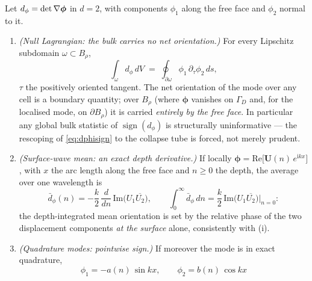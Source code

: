 \begin{lemma}
    \label{lem:orient}
    Let $d_\phi=\det\nabla\bm\phi$ in $d=2$, with components $\phi_1$ along the free face and $\phi_2$ normal to it.
    \begin{enumerate}
        \item[\textup{(i)}] \emph{(Null Lagrangian: the bulk carries no net orientation.)} For every Lipschitz
              subdomain $\omega\subset B_\rho$,
              \begin{equation}
                  \label{eq:nulllag}
                  \int_\omega d_\phi\,dV \;=\; \oint_{\partial\omega}\phi_1\,\partial_\tau\phi_2\,ds ,
              \end{equation}
              $\tau$ the positively oriented tangent. The net orientation of the mode over any cell is a boundary
              quantity; over $B_\rho$ (where $\bm\phi$ vanishes on $\Gamma_D$ and, for the localised mode, on
              $\partial B_\rho$) it is carried \emph{entirely by the free face}. In particular any global bulk
              statistic of $\operatorname{sign}(d_\phi)$ is structurally uninformative --- the rescoping of
              \eqref{eq:dphisign} to the collapse tube is forced, not merely prudent.
        \item[\textup{(ii)}] \emph{(Surface-wave mean: an exact depth derivative.)} If locally
              $\bm\phi=\mathrm{Re}\big[\bm U(n)\,e^{\mathrm{i}kx}\big]$, with $x$ the arc length along the free face
              and $n\ge0$ the depth, the average over one wavelength is
              \begin{equation}
                  \label{eq:dbar}
                  \bar d_\phi(n)=-\frac{k}{2}\,\frac{d}{dn}\,\mathrm{Im}\big(U_1\overline{U_2}\big),
                  \qquad
                  \int_0^\infty \bar d_\phi\,dn=\frac{k}{2}\,\mathrm{Im}\big(U_1\overline{U_2}\big)\Big|_{n=0}:
              \end{equation}
              the depth-integrated mean orientation is set by the relative phase of the two displacement components
              \emph{at the surface} alone, consistently with (i).
        \item[\textup{(iii)}] \emph{(Quadrature modes: pointwise sign.)} If moreover the mode is in exact quadrature,
              \begin{equation}
                  \label{eq:quadmode}
                  \phi_1=-a(n)\,\sin kx,\qquad \phi_2=b(n)\,\cos kx
              \end{equation}

\end{enumerate}
\end{lemma}

